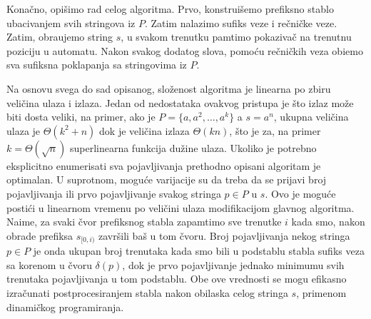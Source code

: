 Kona\v cno, opi\v simo rad celog algoritma. Prvo, konstrui\v semo prefiksno stablo ubacivanjem svih stringova iz $P$. Zatim nalazimo sufiks veze i re\v cni\v cke veze. Zatim, obra\dj ujemo string $s$, u svakom trenutku pamtimo pokaziva\v c na trenutnu poziciju u automatu. Nakon svakog dodatog slova, pomo\' cu re\v cni\v ckih veza obi\dj emo sva sufiksna poklapanja sa stringovima iz $P$.

\noindent
\begin{minipage}[l]{\textwidth}

\end{minipage}

Na osnovu svega do sad opisanog, slo\v zenost algoritma je linearna po zbiru veli\v cina ulaza i izlaza. Jedan od nedostataka ovakvog pristupa je \v sto izlaz mo\v ze biti dosta veliki, na primer, ako je $P = \{a, a^2, \ldots, a^k\}$ a $s = a^n$, ukupna veli\v cina ulaza je $\Theta(k^2+n)$ dok je veli\v cina izlaza $\Theta(kn)$, \v sto je za, na primer $k = \Theta(\sqrt{n})$ superlinearna funkcija du\v zine ulaza. Ukoliko je potrebno eksplicitno enumerisati sva pojavljivanja prethodno opisani algoritam je optimalan. U suprotnom, mogu\' ce varijacije su da treba da se prijavi broj pojavljivanja ili prvo pojavljivanje svakog stringa $p \in P$ u $s$. Ovo je mogu\' ce posti\' ci u linearnom vremenu po veli\v cini ulaza modifikacijom glavnog algoritma. Naime, za svaki \v cvor prefiksnog stabla zapamtimo sve trenutke $i$ kada smo, nakon obrade prefiksa $s_{[0, i)}$ zavr\v sili ba\v s u tom \v cvoru. Broj pojavljivanja nekog stringa $p \in P$ je onda ukupan broj trenutaka kada smo bili u podstablu stabla sufiks veza sa korenom u \v cvoru $\delta(p)$, dok je prvo pojavljivanje jednako minimumu svih trenutaka pojavljivanja u tom podstablu. Obe ove vrednosti se mogu efikasno izra\v cunati postprocesiranjem stabla nakon obilaska celog stringa $s$, primenom dinami\v ckog programiranja.
